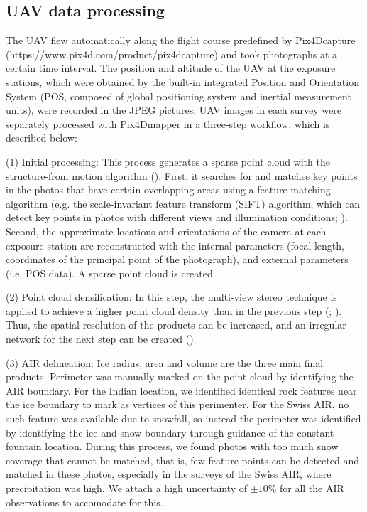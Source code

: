 \documentclass[utf8]{frontiersSCNS} %
\begin{document}
\subsection{UAV data processing} \label{sec:uav}
The UAV flew automatically along the flight course predefined by Pix4Dcapture
(https://www.pix4d.com/product/pix4dcapture) and took photographs at a certain time interval. The position and
altitude of the UAV at the exposure stations, which were obtained by the built-in integrated Position and
Orientation System (POS, composed of global positioning system and inertial measurement units), were recorded in
the JPEG pictures. UAV images in each survey were separately processed with Pix4Dmapper in a three-step workflow,
which is described below:

(1) Initial processing: This process generates a sparse point cloud with the structure-from motion algorithm
(\cite{Turner_2012}). First, it searches for and matches key points in the photos that have certain overlapping
areas using a feature matching algorithm (e.g. the scale-invariant feature transform (SIFT) algorithm, which can
detect key points in photos with different views and illumination conditions; \cite{Lowe_2004}). Second, the
approximate locations and orientations of the camera at each exposure station are reconstructed with the internal
parameters (focal length, coordinates of the principal point of the photograph), and external parameters (i.e. POS
data). A sparse point cloud is created.

(2) Point cloud densification: In this step, the multi-view stereo technique is applied to achieve a higher point
cloud density than in the previous step (\cite{Furukawa_2010}; \cite{Molg_2017}). Thus, the spatial resolution of
the products can be increased, and an irregular network for the next step can be created (\cite{Kung_2011}).

(3) AIR delineation: Ice radius, area and volume are the three main final products. Perimeter was manually marked
on the point cloud by identifying the AIR boundary. For the Indian location, we identified identical rock features
near the ice boundary to mark as vertices of this perimenter. For the Swiss AIR, no such feature was available due
to snowfall, so instead the perimeter was identified by identifying the ice and snow boundary through guidance of
the constant fountain location. During this process, we found photos with too much snow coverage that cannot be matched, that is, few feature
points can be detected and matched in these photos, especially in the surveys of the Swiss AIR, where precipitation
was high. We attach a high uncertainty of $\pm 10 \%$ for all the AIR observations to accomodate for this.
\end{document}
